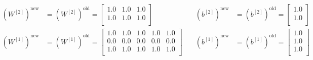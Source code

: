 \documentclass{exam}
\begin{document}
\begin{questions}
\begin{itemize}
                \begin{equation*}
                    \begin{split}
                        (W^{[2]})^{\text{new}} &= (W^{[2]})^{\text{old}} = 
                        \begin{bmatrix}
                            1.0 & 1.0 & 1.0  \\
                            1.0 & 1.0 & 1.0  \\
                        \end{bmatrix}  \\
                        (W^{[1]})^{\text{new}} &= (W^{[1]})^{\text{old}} = 
                        \begin{bmatrix}
                            1.0 & 1.0 & 1.0 & 1.0 & 1.0  \\
                            0.0 & 0.0 & 0.0 & 0.0 & 0.0  \\
                            1.0 & 1.0 & 1.0 & 1.0 & 1.0  \\
                        \end{bmatrix}
                    \end{split} \quad
                    \begin{split}
                        (b^{[2]})^{\text{new}} &= (b^{[2]})^{\text{old}} = 
                        \begin{bmatrix}
                            1.0  \\
                            1.0  \\
                        \end{bmatrix} \\
                        (b^{[1]})^{\text{new}} &= (b^{[1]})^{\text{old}} = 
                        \begin{bmatrix}
                            1.0  \\
                            1.0  \\
                            1.0  \\
                        \end{bmatrix}
                    \end{split}
                \end{equation*}
            \end{itemize}
    \end{questions}
\end{document}
